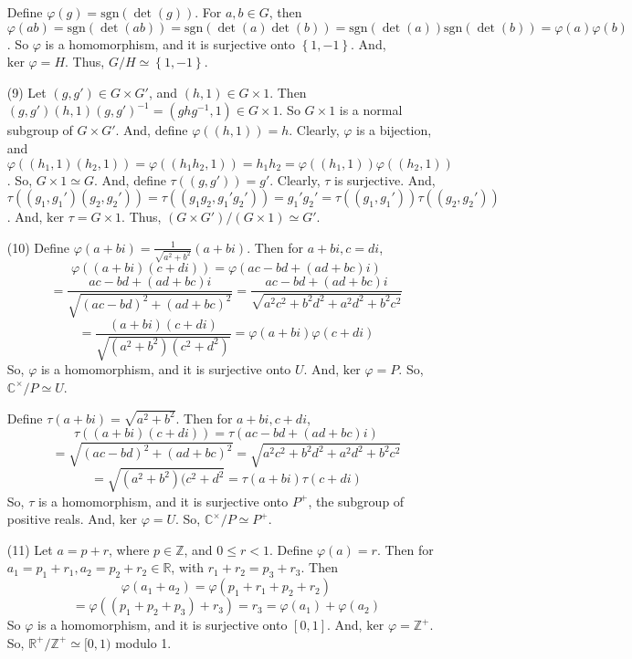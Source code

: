 \begin{itemize}
Define $\varphi(g) = \text{sgn}(\det(g))$. For $a, b \in G$, then $\varphi(ab) = \text{sgn}(\det(ab)) = \text{sgn}(\det(a)\det(b)) = \text{sgn}(\det(a))\text{sgn}(\det(b)) = \varphi(a)\varphi(b)$. So $\varphi$ is a homomorphism, and it is surjective onto $\left\lbrace 1, -1 \right\rbrace$. And, $\text{ker }\varphi = H$. Thus, $G/H \simeq \left\lbrace 1, -1 \right\rbrace$.
\item[(9)]
Let $(g, g') \in G \times G'$, and $(h, 1) \in G \times 1$. Then $(g, g')(h, 1)(g, g')^{-1} = (ghg^{-1}, 1) \in G \times 1$. So $G \times 1$ is a normal subgroup of $G \times G'$. And, define $\varphi((h, 1)) = h$. Clearly, $\varphi$ is a bijection, and $\varphi((h_1, 1)(h_2, 1)) = \varphi((h_1h_2, 1)) = h_1h_2 = \varphi((h_1, 1))\varphi((h_2, 1))$. So, $G \times 1 \simeq G$. And, define $\tau((g, g')) = g'$. Clearly, $\tau$ is surjective. And, $\tau((g_1, g_1')(g_2, g_2')) = \tau((g_1g_2, g_1'g_2')) = g_1'g_2' = \tau((g_1, g_1'))\tau((g_2, g_2'))$. And, $\text{ker }\tau = G \times 1$. Thus, $(G \times G')/(G \times 1) \simeq G'$.
\item[(10)]
Define $\varphi(a + bi) = \frac{1}{\sqrt{a^2+b^2}}(a + bi)$. Then for $a + bi, c = di$,
$$\varphi((a+bi)(c+di)) = \varphi(ac - bd + (ad + bc)i)$$
$$ = \frac{ac - bd + (ad + bc)i}{\sqrt{(ac - bd)^2 + (ad + bc)^2}} = \frac{ac - bd + (ad + bc)i}{\sqrt{a^2c^2 + b^2d^2 + a^2d^2 + b^2c^2}}$$
$$ = \frac{(a + bi)(c + di)}{\sqrt{(a^2 + b^2)(c^2+d^2)}} = \varphi(a+bi)\varphi(c+di)$$
So, $\varphi$ is a homomorphism, and it is surjective onto $U$. And, $\text{ker }\varphi = P$. So, $\mathbb{C}^\times/P \simeq U$.

Define $\tau(a+bi) = \sqrt{a^2 + b^2}$. Then for $a+bi, c+di$,
$$\tau((a+bi)(c+di)) = \tau(ac - bd + (ad + bc)i)$$
$$= \sqrt{(ac - bd)^2 + (ad + bc)^2} = \sqrt{a^2c^2 + b^2d^2 + a^2d^2 + b^2c^2}$$
$$= \sqrt{(a^2+b^2)(c^2+d^2} = \tau(a+bi)\tau(c+di)$$
So, $\tau$ is a homomorphism, and it is surjective onto $P^+$, the subgroup of positive reals. And, $\text{ker }\varphi = U$. So, $\mathbb{C}^\times/P \simeq P^+$.
\item[(11)]
Let $a = p + r$, where $p \in \mathbb{Z}$, and $0 \leq r < 1$. Define $\varphi(a) = r$. Then for $a_1 = p_1 + r_1, a_2 = p_2 + r_2 \in \mathbb{R}$, with $r_1 + r_2 = p_3 + r_3$. Then
$$\varphi(a_1 + a_2) = \varphi(p_1 + r_1 + p_2 + r_2)$$
$$= \varphi((p_1 + p_2 + p_3) + r_3) = r_3 = \varphi(a_1) + \varphi(a_2)$$
So $\varphi$ is a homomorphism, and it is surjective onto $[0, 1]$. And, $\text{ker }\varphi = \mathbb{Z}^+$. So, $\mathbb{R}^+/\mathbb{Z}^+ \simeq [0, 1)$ modulo 1.


\end{itemize}

